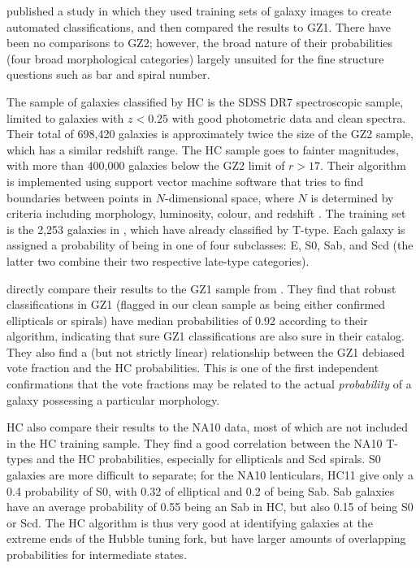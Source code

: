 \documentclass[useAMS,usenatbib]{mn2e}
\begin{document}
\citet[][HC]{hue11} published a study in which they used training sets of galaxy images to create automated classifications, and then compared the results to GZ1. There have been no comparisons to GZ2; however, the broad nature of their probabilities (four broad morphological categories) largely unsuited for the fine structure questions such as bar and spiral number. 

The sample of galaxies classified by HC is the SDSS DR7 spectroscopic sample, limited to galaxies with $z<0.25$ with good photometric data and clean spectra. Their total of 698,420 galaxies is approximately twice the size of the GZ2 sample, which has a similar redshift range. The HC sample goes to fainter magnitudes, with more than 400,000 galaxies below the GZ2 limit of $r>17$. Their algorithm is implemented using support vector machine software that tries to find boundaries between points in $N$-dimensional space, where $N$ is determined by criteria including morphology, luminosity, colour, and redshift \citep{hue08}. The training set is the 2,253 galaxies in \citet{fuk07}, which have already classified by T-type. Each galaxy is assigned a probability of being in one of four subclasses: E, S0, Sab, and Scd (the latter two combine their two respective late-type categories). 

\citet{hue11} directly compare their results to the GZ1 sample from \citet{lin11}. They find that robust classifications in GZ1 (flagged in our clean sample as being either confirmed ellipticals or spirals) have median probabilities of 0.92 according to their algorithm, indicating that sure GZ1 classifications are also sure in their catalog. They also find a (but not strictly linear) relationship between the GZ1 debiased vote fraction and the HC probabilities. This is one of the first independent confirmations that the vote fractions may be related to the actual {\em probability} of a galaxy possessing a particular morphology. 

HC also compare their results to the NA10 data, most of which are not included in the HC training sample. They find a good correlation between the NA10 T-types and the HC probabilities, especially for ellipticals and Scd spirals. S0 galaxies are more difficult to separate; for the NA10 lenticulars, HC11 give only a 0.4 probability of S0, with 0.32 of elliptical and 0.2 of being Sab. Sab galaxies have an average probability of 0.55 being an Sab in HC, but also 0.15 of being S0 or Scd. The HC algorithm is thus very good at identifying galaxies at the extreme ends of the Hubble tuning fork, but have larger amounts of overlapping probabilities for intermediate states. 
\end{document}
